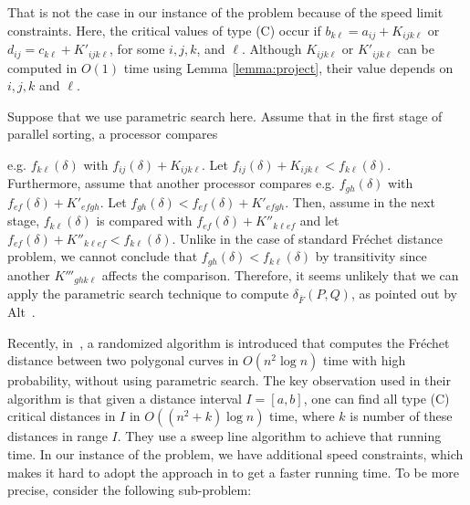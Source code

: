 \documentclass[12pt]{dalthesis}
\newcommand{\REM}[1]{}
\newcommand{\CF}{{\mathscr F}}
\newcommand{\Frechet}{Fr\'echet }
\newcommand{\distFS}{\delta_{\bar{F}}} \newcommand{\distWeakF}{\delta_{\bar{N}}} \newcommand{\distClosedF}{\delta_{\bar{C}}} \newcommand{\distPartialF}{\delta_{\bar{P}}} \newcommand{\distGrpahF}{\delta_{\bar{G}}} \newcommand{\distDisF}{\delta_{dF}} \newcommand{\distGeoF}{\delta_{\hat{F}}} \newcommand{\distHomF}{\delta_{h}} \newcommand{\distC}{\delta_C} \newcommand{\distSetF}{\delta_{\CF}}
\begin{document}
That is not the case in our instance of the problem
because of the speed limit constraints.
Here, the critical values of type (C) occur if 
$b_{k\ell} = a_{ij}  +K_{ijk\ell}$ or $d_{ij} = c_{k\ell} + K'_{ijk\ell}$, 
for some $i,j,k$, and $\ell$. 
Although $K_{ijk\ell}$ or $K'_{ijk\ell}$
can be computed in $O(1)$ time
using Lemma \ref{lemma:project}, 
their value depends on  $i,j,k$ and $\ell$. 

Suppose that we use parametric search here. 
Assume that in the first stage of
parallel sorting, 
a processor compares
\REM{
e.g. $b_{k\ell}(\delta)$ with $a_{ij}(\delta) +K_{ijk\ell}$. 
Let $a_{ij}(\delta) +K_{ijk\ell} < b_{k\ell}(\delta)$. 
Furthermore, assume that another processor compares e.g.
$b_{gh}(\delta)$ with $a_{ef}(\delta) + K'_{efgh}$.
Let $ b_{gh}(\delta) < a_{ef}(\delta) + K'_{efgh}$. 
Then, assume in the next stage, 
$b_{k\ell}(\delta)$ is compared with $a_{ef}(\delta) + K''_{k\ell ef}$ and 
let $b_{k\ell}(\delta) < a_{ef}(\delta) + K''_{k\ell ef}$.
Unlike in the case of standard \Frechet distance problem, 
we cannot conclude that $b_{gh}(\delta)<b_{k\ell}(\delta)$ 
}
e.g. $f_{k\ell}(\delta)$ with $f_{ij}(\delta) +K_{ijk\ell}$. 
Let $f_{ij}(\delta) +K_{ijk\ell} < f_{k\ell}(\delta)$. 
Furthermore, assume that another processor compares e.g.
$f_{gh}(\delta)$ with $f_{ef}(\delta) + K'_{efgh}$.
Let $f_{gh}(\delta) < f_{ef}(\delta) + K'_{efgh}$. 
Then, assume in the next stage, 
$f_{k\ell}(\delta)$ is compared with $f_{ef}(\delta) + K''_{k\ell ef}$ and 
let $f_{ef}(\delta) + K''_{k\ell ef} < f_{k\ell}(\delta)$.
Unlike in the case of standard \Frechet distance problem, 
we cannot conclude that $f_{gh}(\delta)<f_{k\ell}(\delta)$ 
by transitivity since 
another $K'''_{ghk\ell}$ affects 
the comparison. Therefore, it seems unlikely that we can 
apply the parametric search technique
to compute $\distFS(P,Q)$, as pointed out by Alt~\cite{AltFinal}.


Recently, in~\cite{HarPeled11}, 
a  randomized algorithm is introduced that computes 
the \Frechet distance between two polygonal curves in $O(n^2 \log n)$ 
time with high probability, without using parametric search.
The key observation used in their algorithm is that
given a distance interval $I=[a,b]$, one can
find all type (C) critical distances in $I$ in
$O( (n^2 + k) \log n )$ time, where $k$ is number of these distances in range $I$.
They use a sweep line algorithm to achieve that running time.
In our instance of the problem, we have additional speed constraints, 
which makes it  hard to adopt the approach in \cite{HarPeled11}
to get a faster running time.
To be more precise,  consider the following sub-problem:
\end{document}
